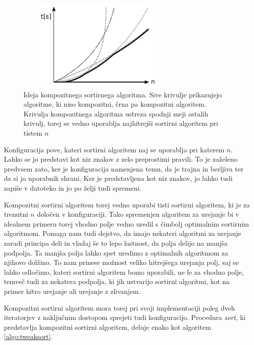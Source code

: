 \documentclass[a4paper,oneside,12pt]{article}
\begin{document}
\begin{figure}[ht]
    \begin{center}
        \includegraphics[width=80mm,height=45mm]{slike/tweaksortidea.pdf}
    \end{center}
    \vspace{-0.7cm}
    \caption[Ideja kompozitnega sortirnega algoritma.]{Ideja kompozitnega sortirnega algoritma.
    Sive krivulje prikazujejo algoritme, ki niso kompozitni, črna pa kompozitni algoritem.
    Krivulja kompozitnega algoritma ustreza spodnji meji ostalih krivulj, torej se vedno uporablja 
    najhitrejši sortirni algoritem pri tistem $n$}
    \label{fig:tweaksortidea}
\end{figure}

Konfiguracija pove, kateri sortirni algoritem naj se uporablja pri
katerem $n$. Lahko se jo predstavi kot niz znakov z zelo preprostimi
pravili. To je zaželeno predvsem zato, ker je konfiguracija namenjena temu, da je trajna
in berljiva ter da si jo uporabnik shrani. Ker je predstavljena kot niz
znakov, jo lahko tudi zapiše v datoteko in jo po želji tudi spremeni.

Kompozitni sortirni algoritem torej vedno uporabi tisti sortirni algoritem, ki je za  
trenutni $n$ določen v konfiguraciji. Tako spremenjen algoritem za urejanje bi v idealnem
primeru torej vhodno polje vedno uredil s čimbolj optimalnim sortirnim algoritmom.
Pomaga nam tudi dejstvo, da imajo nekateri algoritmi za urejanje zaradi principa deli in vladaj
še to lepo lastnost, da polja delijo na manjša podpolja. Ta manjša polja lahko spet
uredimo z optimalnih algoritmom za njihovo dolžino. To nam prinese možnost veliko hitrejšega
urejanja polj, saj se lahko odločimo, kateri sortirni algoritem bomo
uporabili, ne le za vhodno polje, temveč tudi za nekatera podpolja, ki jih ustvarijo
sortirni algoritmi, kot na primer hitro urejanje ali urejanje z zlivanjem.

Kompozitni sortirni algoritem mora torej pri svoji implementaciji poleg dveh 
iteratorjev z naključnim dostopom sprejeti tudi konfiguracijo. Procedura \emph{sort},
ki predstavlja kompozitni sortirni algoritem, deluje enako kot algoritem
\ref{algo:tweaksort}. 
\end{document}
